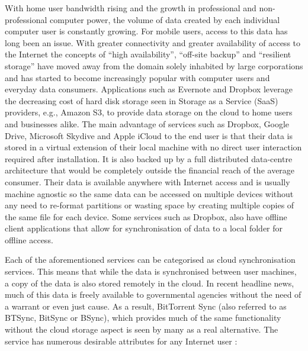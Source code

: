 \documentclass[final,5p,times,twocolumn]{elsarticle}
\begin{document}
With home user bandwidth rising and the growth in professional and non-professional computer power, the volume of data created by each individual computer user is constantly growing. For mobile users, access to this data has long been an issue. With greater connectivity and greater availability of access to the Internet the concepts of ``high availability'', ``off-site backup'' and ``resilient storage'' have moved away from the domain solely inhabited by large corporations and has started to become increasingly popular with computer users and everyday data consumers. Applications such as Evernote and Dropbox leverage the decreasing cost of hard disk storage seen in Storage as a Service (SaaS) providers, e.g., Amazon S3, to provide data storage on the cloud to home users and businesses alike. The main advantage of services such as Dropbox, Google Drive, Microsoft Skydive and Apple iCloud to the end user is that their data is stored in a virtual extension of their local machine with no direct user interaction required after installation. It is also backed up by a full distributed data-centre architecture that would be completely outside the financial reach of the average consumer. Their data is available anywhere with Internet access and is usually machine agnostic so the same data can be accessed on multiple devices without any need to re-format partitions or wasting space by creating multiple copies of the same file for each device. Some services such as Dropbox, also have offline client applications that allow for synchronisation of data to a local folder for offline access.

Each of the aforementioned services can be categorised as cloud synchronisation services. This means that while the data is synchronised between user machines, a copy of the data is also stored remotely in the cloud. In recent headline news, much of this data is freely available to governmental agencies without the need of a warrant or even just cause. As a result, BitTorrent Sync (also referred to as BTSync, BitSync or BSync), which provides much of the same functionality without the cloud storage aspect is seen by many as a real alternative. The service has numerous desirable attributes for any Internet user \cite{bitsync}:
\end{document}

